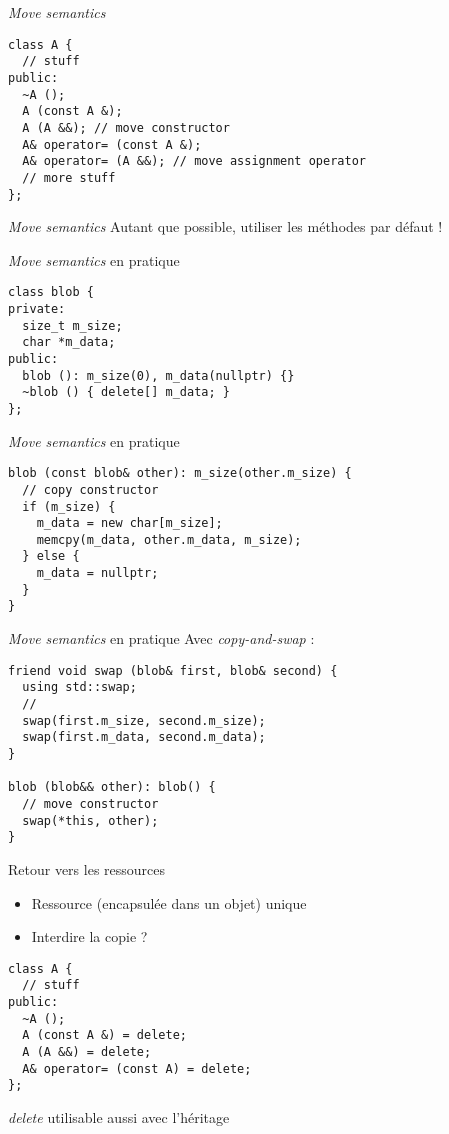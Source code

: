 \begin{frame}[fragile]{\textit{Move semantics}}
  \begin{lstlisting}
class A {
  // stuff
public:
  ~A ();
  A (const A &);
  A (A &&); // move constructor
  A& operator= (const A &);
  A& operator= (A &&); // move assignment operator
  // more stuff
};
  \end{lstlisting}
\end{frame}

\begin{frame}{\textit{Move semantics}}
  Autant que possible, utiliser les méthodes par défaut !
\end{frame}

\begin{frame}[fragile]{\textit{Move semantics} en pratique}
  \begin{lstlisting}
class blob {
private:
  size_t m_size;
  char *m_data;
public:
  blob (): m_size(0), m_data(nullptr) {}
  ~blob () { delete[] m_data; }
};
  \end{lstlisting}
\end{frame}

\begin{frame}[fragile]{\textit{Move semantics} en pratique}
  \begin{lstlisting}
blob (const blob& other): m_size(other.m_size) {
  // copy constructor
  if (m_size) {
    m_data = new char[m_size];
    memcpy(m_data, other.m_data, m_size);
  } else {
    m_data = nullptr;
  }
}
  \end{lstlisting}
\end{frame}

\begin{frame}[fragile]{\textit{Move semantics} en pratique}
  Avec \textit{copy-and-swap} :
  
  \begin{lstlisting}
friend void swap (blob& first, blob& second) {
  using std::swap;
  //
  swap(first.m_size, second.m_size);
  swap(first.m_data, second.m_data);
}

blob (blob&& other): blob() {
  // move constructor
  swap(*this, other);
}
  \end{lstlisting}
\end{frame}

\begin{frame}[fragile]{Retour vers les ressources}
  \begin{itemize}
  \item Ressource (encapsulée dans un objet) \og{}unique\fg{}
  \item Interdire la copie ?
  \end{itemize}

  \begin{lstlisting}
class A {
  // stuff
public:
  ~A ();
  A (const A &) = delete;
  A (A &&) = delete;
  A& operator= (const A) = delete;
};
  \end{lstlisting}

  \textit{delete} utilisable aussi avec l'héritage
\end{frame}

